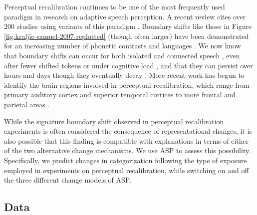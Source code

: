 \documentclass[
  11pt,
  man,floatsintext]{apa6}
\begin{document}
Perceptual recalibration continues to be one of the most frequently used paradigm in research on adaptive speech perception. A recent review cites over 200 studies using variants of this paradigm \autocite{theodore2021}. Boundary shifts like those in Figure \ref{fig:kraljic-samuel-2007-replotted} (though often larger) have been demonstrated for an increasing number of phonetic contrasts and languages \autocites[e.g.,][]{hanulikova-weber2012,kraljic-samuel2005,kraljic-samuel2006,reinisch2013,sumner2011,vroomen2007}. We now know that boundary shifts can occur for both isolated and connected speech \autocites[e.g.,][]{eisner-mcqueen2005,reinisch-holt2013}, even after fewer shifted tokens \autocites[e.g., as few as four,][]{liu-jaeger2018,liu-jaeger2019} or under cognitive load \autocites{baart-vroomen2010,zhang-samuel2014}[but see][]{samuel2016}, and that they can persist over hours and days \autocite{eisner-mcqueen2006,vroomen-baart2009,saltzman-myers2021} though they eventually decay \autocite{samuel2021,zheng-samuel2023}. More recent work has begun to identify the brain regions involved in perceptual recalibration, which range from primary auditory cortex and superior temporal cortices to more frontal and parietal areas \autocites{bonte2017,kilianhutten2011,myers-mesite2014,ullas2020,luthra2020a}[for review, see][]{guediche2014}.

While the signature boundary shift observed in perceptual recalibration experiments is often considered the consequence of representational changes, it is also possible that this finding is compatible with explanations in terms of either of the two alternative change mechanisms. We use ASP to assess this possibility. Specifically, we predict changes in categorization following the type of exposure employed in experiments on perceptual recalibration, while switching on and off the three different change models of ASP.

\subsection{Data}\label{data}
\end{document}

